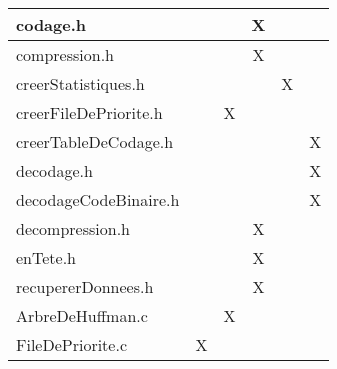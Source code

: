 \begin{table}[h]
\begin{tabular}{l|c|c|c|c|c|}
\multicolumn{1}{|l|}{codage.h}            &                       &                & X                       &                       &                       \\ \hline
\multicolumn{1}{|l|}{compression.h}             &                       &                & X                      &                       &                       \\ \hline
\multicolumn{1}{|l|}{creerStatistiques.h}                  &                       &               &                       & X                       &                        \\ \hline
\multicolumn{1}{|l|}{creerFileDePriorite.h}                             &                       & X              &                       &                       &                        \\ \hline
\multicolumn{1}{|l|}{creerTableDeCodage.h}                         &                       &                &                      &                       & X                        \\ \hline
\multicolumn{1}{|l|}{decodage.h}                            &                       &                &                      &                       & X                        \\ \hline
\multicolumn{1}{|l|}{decodageCodeBinaire.h}                            &                       &                &                      &                       & X                        \\ \hline
\multicolumn{1}{|l|}{decompression.h}                            &                       &                & X                     &                       &                        \\ \hline
\multicolumn{1}{|l|}{enTete.h}                            &                       &                & X                     &                       &                        \\ \hline
\multicolumn{1}{|l|}{recupererDonnees.h}                            &                       &                & X                     &                       &                        \\ \hline
\multicolumn{1}{|l|}{ArbreDeHuffman.c}                            &                       & X                &                      &                       &                        \\ \hline
\multicolumn{1}{|l|}{FileDePriorite.c}                            & X                      &                &                      &                       &                        \\ \hline

\end{tabular}
\end{table}
